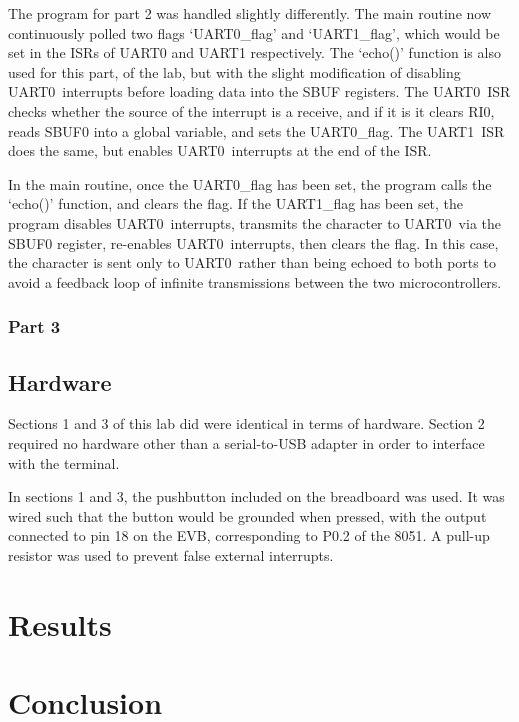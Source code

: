 \documentclass[12pt]{article}
\newcommand{\uz}{UART0}
\newcommand{\uo}{UART1}
\begin{document}
The program for part 2 was handled slightly differently. The main routine now continuously polled two flags `UART0\_flag' and `UART1\_flag', which would be set in the ISRs of UART0 and UART1 respectively. The `echo()' function is also used for this part, of the lab, but with the slight modification of disabling \uz\ interrupts before loading data into the SBUF registers. The \uz\ ISR checks whether the source of the interrupt is a receive, and if it is it clears RI0, reads SBUF0 into a global variable, and sets the \uz\_flag. The \uo\ ISR does the same, but enables \uz\ interrupts at the end of the ISR. 

In the main routine, once the \uz\_flag has been set, the program calls the `echo()' function, and clears the flag. If the \uo\_flag has been set, the program disables \uz\ interrupts, transmits the character to \uz\ via the SBUF0 register, re-enables \uz\ interrupts, then clears the flag. In this case, the character is sent only to \uz\ rather than being echoed to both ports to avoid a feedback loop of infinite transmissions between the two microcontrollers.




\subsubsection{Part 3}
\subsection{Hardware}

Sections 1 and 3 of this lab did were identical in terms of hardware. Section 2 required no hardware other than a serial-to-USB adapter in order to interface with the terminal.

In sections 1 and 3, the pushbutton included on the breadboard was used. It was wired such that the button would be grounded when pressed, with the output connected to pin 18 on the EVB, corresponding to P0.2 of the 8051. A pull-up resistor was used to prevent false external interrupts.
 
\section{Results}




\section{Conclusion}
\end{document}
